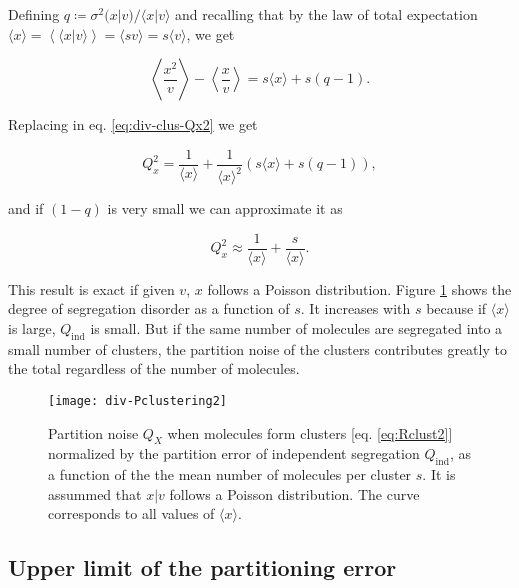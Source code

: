 Defining $q\coloneqq\sigma^2(x|v)/\langle x|v\rangle$ and recalling that by the law of total expectation $\langle x\rangle = \left\langle\langle x|v\rangle\right\rangle = \langle sv\rangle =s\langle v\rangle$, we get

\begin{equation*}
  \left\langle \frac{x^2}{v}\right\rangle-\left\langle \frac{x}{v}\right\rangle = s\langle x\rangle+s(q-1).
\end{equation*}

Replacing in eq. \eqref{eq:div-clus-Qx2} we get

\begin{equation*}
  Q_x^2 = \frac{1}{\langle x\rangle} + \frac{1}{\langle x\rangle^2}\left(s\langle x\rangle+s(q-1)\right),
\end{equation*}

and if $(1-q)$ is very small we can approximate it as

\begin{equation}
  \label{eq:Rclust2}
  Q_x^2 \approx \frac{1}{\langle x\rangle} + \frac{s}{\langle x\rangle}.
\end{equation}

This result is exact if given $v$, $x$ follows a Poisson distribution. Figure \ref{fig:div-Pclustering2} shows the degree of segregation disorder as a function of $s$. It increases with $s$ because if $\langle x\rangle$ is large, $Q_\text{ind}$ is small. But if the same number of molecules are segregated into a small number of clusters, the partition noise of the clusters contributes greatly to the total regardless of the number of molecules.

\begin{figure}[H]
  \centering
  \texttt{[image: div-Pclustering2]}
  \caption[Partition noise when molecules form clusters as a function of the number of molecules per cluster]{\label{fig:div-Pclustering2}Partition noise $Q_X$ when molecules form clusters [eq. \eqref{eq:Rclust2}] normalized by the partition error of independent segregation $Q_\text{ind}$, as a function of the the mean number of molecules per cluster $s$. It is assummed that $x|v$ follows a Poisson distribution. The curve corresponds to all values of $\langle x\rangle$.}
\end{figure}

\subsection{Upper limit of the partitioning error}

